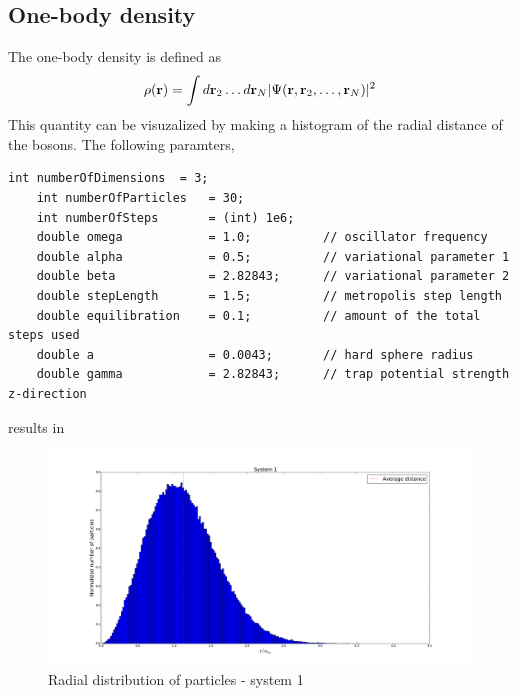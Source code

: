 \documentclass[english, a4paper]{article}
\begin{document}
\subsection{One-body density}
The one-body density is defined as
\begin{equation}
 \rho({\bf r}) = \int d{\bf r}_2 \dots d{\bf r}_N |\Psi({\bf r}, {\bf r}_2, \dots , {\bf r}_N)|^2
\end{equation}
This quantity can be visuzalized by making a histogram of the radial distance of the bosons.
The following paramters,
\belowcaptionskip=-10pt
\begin{lstlisting}[label=parameters3,caption=Parameters system 2]
    int numberOfDimensions  = 3;
    int numberOfParticles   = 30;
    int numberOfSteps       = (int) 1e6;
    double omega            = 1.0;          // oscillator frequency
    double alpha            = 0.5;          // variational parameter 1
    double beta             = 2.82843;      // variational parameter 2
    double stepLength       = 1.5;          // metropolis step length
    double equilibration    = 0.1;          // amount of the total steps used
    double a                = 0.0043;       // hard sphere radius
    double gamma            = 2.82843;      // trap potential strength z-direction
\end{lstlisting}
results in
\begin{figure}[H]
\begin{center}
  \includegraphics[width = 200mm]{radialDistSystem1.pdf}
  \caption{Radial distribution of particles - system 1}\label{fig:density1}
  \end{center}
\end{figure}
\end{document}
